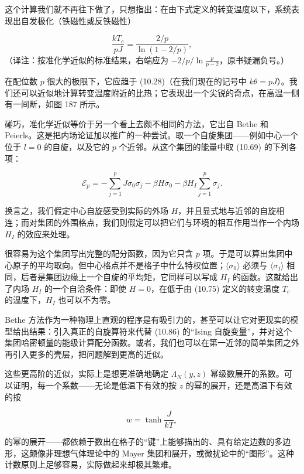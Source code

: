 这个计算我们就不再往下做了，只想指出：在由下式定义的转变温度以下，系统表现出自发极化（铁磁性或反铁磁性）

\begin{equation*}
\frac{kT_c}{pJ} = \frac{2/p}{\ln(1 - 2/p)},
\tag{10.85}
\end{equation*}
（译注：按准化学近似的标准结果，右端应为 $-2/p\big/\ln\frac{p}{p-2}$，原书疑漏负号。）

在配位数 $p$ 很大的极限下，它应趋于 (10.28)（在我们现在的记号中 $k\theta = pJ$）。我们还可以近似地计算转变温度附近的比热；它表现出一个尖锐的奇点，在高温一侧有一间断，如图 187 所示。

碰巧，准化学近似等价于另一个看上去颇不相同的方法，它出自 Bethe 和 Peierls。这是把内场论证加以推广的一种尝试。取一个自旋集团——例如中心一个位于 $l = 0$ 的自旋，以及它的 $p$ 个近邻。从这个集团的能量中取 (10.69) 的下列各项：

\begin{equation*}
\mathcal{E}_p = -\sum_{j=1}^{p} J \sigma_0 \sigma_j - \beta H \sigma_0 - \beta H_I \sum_{j=1}^{p} \sigma_j.
\tag{10.86}
\end{equation*}

换言之，我们假定中心自旋感受到实际的外场 $H$，并且显式地与近邻的自旋相连；而对集团的外围格点，我们则假定可以把它们与环境的相互作用当作一个内场 $H_I$ 的效应来处理。


很容易为这个集团写出完整的配分函数，因为它只含 $p$ 项。于是可以算出集团中心原子的平均取向。但中心格点并不是格子中什么特权位置；$\langle \sigma_0 \rangle$ 必须与 $\langle \sigma_j \rangle$ 相同，后者是集团边缘上一个自旋的平均矩，它同样可以写成 $H_I$ 的函数。这就给出了内场 $H_I$ 的一个自洽条件：即使 $H = 0$，在低于由 (10.75) 定义的转变温度 $T_c$ 的温度下，$H_I$ 也可以不为零。

Bethe 方法作为一种物理上直观的程序是有吸引力的，甚至可以让它对更现实的模型给出结果：引入真正的自旋算符来代替 (10.86) 的“Ising 自旋变量”，并对这个集团哈密顿量的能级计算配分函数。或者，我们也可以在第一近邻的简单集团之外再引入更多的壳层，把问题解到更高的近似。

这些更高阶的近似，实际上是想更准确地确定 $\Lambda_N(y, z)$ 幂级数展开的系数。可以证明，每一个系数——无论是低温下有效的按 $z$ 的幂的展开，还是高温下有效的按

\begin{equation*}
w = \tanh \frac{J}{kT},
\tag{10.87}
\end{equation*}

的幂的展开——都依赖于数出在格子的“键”上能够描出的、具有给定边数的多边形，这颇像非理想气体理论中的 Mayer 集团和展开，或微扰论中的“图形”。这种计数原则上足够容易，实际做起来却极其繁难。

